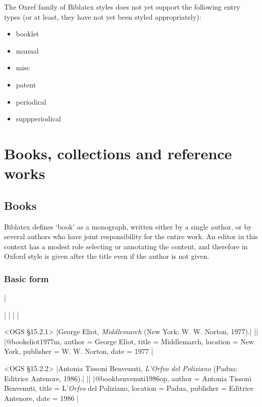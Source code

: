 \documentclass[extrafontsizes,11pt,a4paper,oneside]{memoir}
\newcommand*{\code}[1]{`\textsf{#1}'}
\begin{document}
The Oxref family of Biblatex styles does not yet support the following entry types
(or at least, they have not yet been styled appropriately):

\begin{multicols}{2}
  \begin{itemize}\firmlist
    \item booklet
    \item manual
    \item misc
    \item patent
    \item periodical
    \item suppperiodical
  \end{itemize}
\end{multicols}

\chapter{Books, collections and reference works}\label{sec:book}

\section{Books}

Biblatex defines \code{book} as a monograph, written either by a single author, or by several authors who have joint responsibility for the entire work. An editor in this context has a modest role selecting or annotating the content, and therefore in Oxford style is given after the title even if the author is not given.

\subsection{Basic form}
|

\todoc[oxnotes]|
|
\todoc[oxyear]|
|

\bibexample<OGS \S15.2.1>
|George Eliot, \emph{Middlemarch} (New York: W. W. Norton, 1977).|%
||%
|@book{eliot1977m,
  author = {George Eliot},
  title = {Middlemarch},
  location = {New York},
  publisher = {W. W. Norton},
  date = {1977}
}|

\bibexample<OGS \S15.2.2>
|Antonia Tissoni Benvenuti, \emph{L'\emph{Orfeo} del Poliziano} (Padua: Editrice Antenore, 1986).|%
||%
|@book{benvenuti1986op,
  author = {Antonia Tissoni Benvenuti},
  title = {L'\emph{Orfeo} del Poliziano},
  location = {Padua},
  publisher = {Editrice Antenore},
  date = {1986}
}|
\end{document}
